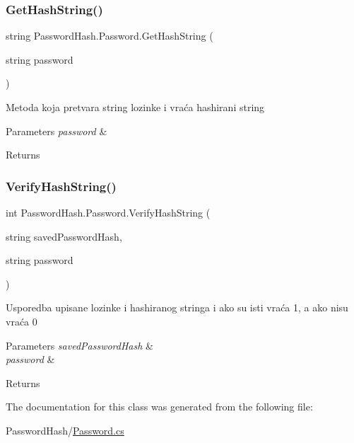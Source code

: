 \subsubsection{\texorpdfstring{Get\+Hash\+String()}{GetHashString()}}
{\footnotesize\ttfamily string Password\+Hash.\+Password.\+Get\+Hash\+String (\begin{DoxyParamCaption}\item[{string}]{password }\end{DoxyParamCaption})}



Metoda koja pretvara string lozinke i vraća hashirani string 


\begin{DoxyParams}{Parameters}
{\em password} & \\
\hline
\end{DoxyParams}
\begin{DoxyReturn}{Returns}

\end{DoxyReturn}
\mbox{\label{class_password_hash_1_1_password_aeaea787c192b9ccbb753ac1e9f8ab325}} 
\subsubsection{\texorpdfstring{Verify\+Hash\+String()}{VerifyHashString()}}
{\footnotesize\ttfamily int Password\+Hash.\+Password.\+Verify\+Hash\+String (\begin{DoxyParamCaption}\item[{string}]{saved\+Password\+Hash,  }\item[{string}]{password }\end{DoxyParamCaption})}



Usporedba upisane lozinke i hashiranog stringa i ako su isti vraća 1, a ako nisu vraća 0 


\begin{DoxyParams}{Parameters}
{\em saved\+Password\+Hash} & \\
\hline
{\em password} & \\
\hline
\end{DoxyParams}
\begin{DoxyReturn}{Returns}

\end{DoxyReturn}


The documentation for this class was generated from the following file\+:\begin{DoxyCompactItemize}
\item 
Password\+Hash/\mbox{\hyperlink{_password_8cs}{Password.\+cs}}\end{DoxyCompactItemize}
